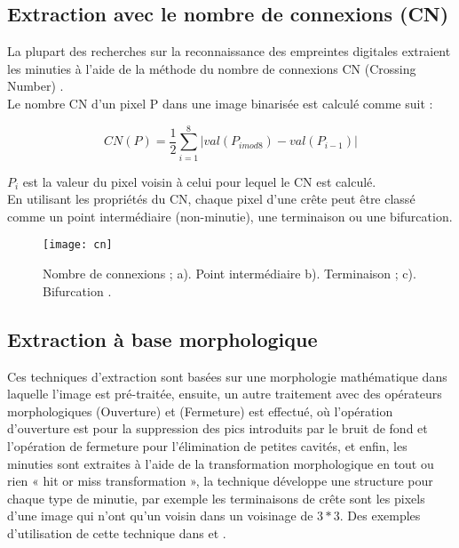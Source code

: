 \subsection{Extraction avec le nombre de connexions (CN)}
\label{chp2cn}
La plupart des recherches sur la reconnaissance des empreintes digitales extraient les minuties à l'aide de la méthode du nombre de connexions CN (Crossing Number) \citep{Thai2003}.
\\
Le nombre CN d'un pixel P dans une image binarisée est calculé comme suit \citep{maltoni2009handbook} :
\begin{center}
	\begin{equation}\label{eq:cn}
	CN (P) = \frac{1}{2}\sum_{i=1}^{8}|val (P_{i mod 8 } )- val(P_{i-1}) |
	\end{equation}
\end{center}
$ P_{i} $ est la valeur du pixel voisin à celui pour lequel le CN est calculé.
\\En utilisant les propriétés du CN, chaque pixel d'une crête peut être classé comme un point intermédiaire (non-minutie), une terminaison ou une bifurcation.

\begin{center}
	\begin{figure}[H]
		\centering
		\texttt{[image: cn]}
		\caption{Nombre de connexions ; a). Point intermédiaire b). Terminaison ; c). Bifurcation \citep{maltoni2009handbook}.}
		\label{fig:chapitre2cn}
	\end{figure}
\end{center}

\subsection{Extraction à base morphologique}
Ces techniques d'extraction sont basées sur une morphologie mathématique dans laquelle l'image est pré-traitée, ensuite, un autre traitement avec des opérateurs morphologiques (Ouverture) et (Fermeture) est effectué, où l'opération d'ouverture est pour la suppression des pics introduits par le bruit de fond et l'opération de fermeture pour l'élimination de petites cavités, et enfin, les minuties sont extraites à l'aide de la transformation morphologique en tout ou rien « hit or miss transformation », la technique développe une structure pour chaque type de minutie, par exemple les terminaisons de crête sont les pixels d'une image qui n'ont qu'un voisin dans un voisinage de $ 3 * 3 $. Des exemples d'utilisation de cette technique dans \citep{humbe2007mathematical} et \citep{bansal2010effective}.


